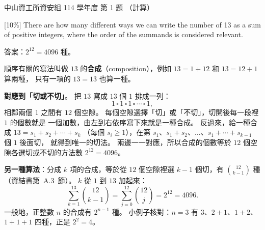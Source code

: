 \begin{pastexam}[label={px:nsysu-114-dmalg-01}]{中山資工所資安組 114 學年度 第 1 題}
（計算）

{[10\%]} There are how many different ways we can write the number of 13 as a sum of positive
integers, where the order of the summands is considered relevant.
\end{pastexam}

\begin{pastsoln}
答案：$2^{12} = 4096$ 種。

順序有關的寫法叫做 $13$ 的\textbf{合成}（composition），例如 $13 = 1 + 12$ 和 $13 = 12 + 1$ 算兩種，
只有一項的 $13 = 13$ 也算一種。

\textbf{對應到「切或不切」}。 把 $13$ 寫成 $13$ 個 $1$ 排成一列：
\[
1 \,\square\, 1 \,\square\, 1 \,\square\, \cdots \,\square\, 1,
\]
相鄰兩個 $1$ 之間有 $12$ 個空隙。 每個空隙選擇「切」或「不切」，切開後每一段裡 $1$ 的個數就是
一個加數，由左到右依序寫下來就是一種合成。 反過來，給一種合成 $13 = s_1 + s_2 + \cdots + s_k$
（每個 $s_i \ge 1$），在第 $s_1$、$s_1 + s_2$、$\ldots$、$s_1 + \cdots + s_{k-1}$ 個 $1$ 後面切，
就得到唯一的切法。 兩邊一一對應，所以合成的個數等於 $12$ 個空隙各選切或不切的方法數
$2^{12} = 4096$。

\textbf{另一種算法}：分成 $k$ 項的合成，等於從 $12$ 個空隙裡選 $k - 1$ 個切，有
$\binom{12}{k-1}$ 種（資結書第~A.3~節）。 $k$ 從 $1$ 到 $13$ 加起來：
\[
\sum_{k=1}^{13} \binom{12}{k-1} = \sum_{j=0}^{12} \binom{12}{j} = 2^{12} = 4096 .
\]
一般地，正整數 $n$ 的合成有 $2^{n-1}$ 種。 小例子核對：$n = 3$ 有 $3$、$2+1$、$1+2$、$1+1+1$
四種，正是 $2^{2} = 4$。
\end{pastsoln}
